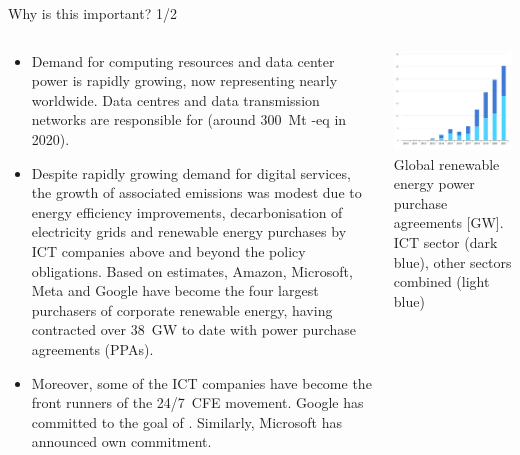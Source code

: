 \begin{frame}{Why is this important? 1/2}

  {\footnotesize

  \begin{columns}[T]
    \begin{column}{9cm}
      \begin{itemize}
        \item   
        Demand for computing resources and data center power is rapidly growing, now representing nearly  worldwide. 
        Data centres and data transmission networks are responsible for  (around 300~Mt \co-eq in 2020).
      
        \item Despite rapidly growing demand for digital services, the growth of associated emissions was modest due to energy efficiency improvements, decarbonisation of electricity grids and renewable energy purchases by ICT companies above and beyond the policy obligations. Based on  estimates, Amazon, Microsoft, Meta and Google have become the four largest purchasers of corporate renewable energy, having contracted over 38~GW to date with power purchase agreements (PPAs).
      
        \item Moreover, some of the ICT companies have become the front runners of the 24/7~CFE movement. Google has committed to the goal of . Similarly, Microsoft has announced own  commitment.

      \end{itemize}
      \end{column}
  
      \begin{column}{6cm}
      \centering
      \vspace{.3cm}
      \includegraphics[width=6cm]{images/iea-PPAbysector-2010-2021.png}
      {\scriptsize
      Global renewable energy power purchase agreements [GW]. ICT sector (dark blue), other sectors combined (light blue)}
    \end{column}
  

\end{columns}}
\end{frame}
